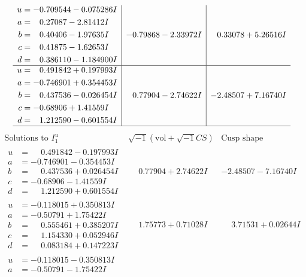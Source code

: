 \documentclass[1p]{elsarticle_modified}
\theoremstyle{definition}
\newcommand{\I}{\sqrt{-1}}
\begin{document}
$$\begin{array}{c|c|c}
\begin{aligned}
u &= -0.709544 - 0.075286 I \\
a &= \phantom{-}0.27087 - 2.81412 I \\
b &= \phantom{-}0.40406 - 1.97635 I \\
c &= \phantom{-}0.41875 - 1.62653 I \\
d &= \phantom{-}0.386110 - 1.184900 I\end{aligned}
 & -0.79868 - 2.33972 I & \phantom{-}0.33078 + 5.26516 I \\ \hline\begin{aligned}
u &= \phantom{-}0.491842 + 0.197993 I \\
a &= -0.746901 + 0.354453 I \\
b &= \phantom{-}0.437536 - 0.026454 I \\
c &= -0.68906 + 1.41559 I \\
d &= \phantom{-}1.212590 - 0.601554 I\end{aligned}
 & \phantom{-}0.77904 - 2.74622 I & -2.48507 + 7.16740 I\\
 \hline 
 \end{array}$$\newpage$$\begin{array}{c|c|c}  
\text{Solutions to }I^u_{1}& \I (\text{vol} + \sqrt{-1}CS) & \text{Cusp shape}\\
 \hline 
\begin{aligned}
u &= \phantom{-}0.491842 - 0.197993 I \\
a &= -0.746901 - 0.354453 I \\
b &= \phantom{-}0.437536 + 0.026454 I \\
c &= -0.68906 - 1.41559 I \\
d &= \phantom{-}1.212590 + 0.601554 I\end{aligned}
 & \phantom{-}0.77904 + 2.74622 I & -2.48507 - 7.16740 I \\ \hline\begin{aligned}
u &= -0.118015 + 0.350813 I \\
a &= -0.50791 + 1.75422 I \\
b &= \phantom{-}0.555461 + 0.385207 I \\
c &= \phantom{-}1.154330 + 0.052946 I \\
d &= \phantom{-}0.083184 + 0.147223 I\end{aligned}
 & \phantom{-}1.75773 + 0.71028 I & \phantom{-}3.71531 + 0.02644 I \\ \hline\begin{aligned}
u &= -0.118015 - 0.350813 I \\
a &= -0.50791 - 1.75422 I \\

\end{aligned}
\end{array}$$
\end{document}
